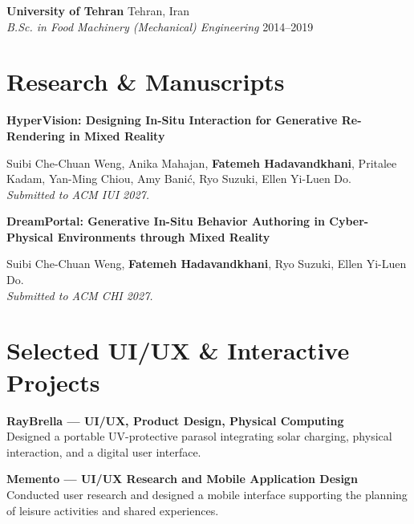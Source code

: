\documentclass[10pt,letterpaper]{article}
\newcommand{\cvitem}[4]{%
  {\bfseries\color{darkteal}#1}
  \hfill
  {\small\color{muted}#2}\\
  {\textit{#3}}
  \hfill
  {\small\color{muted}#4}%
  \vspace{4pt}%
}
\newcommand{\project}[2]{%
  {\bfseries\color{darkteal}#1}\\[1pt]
  {\color{muted}#2}%
  \vspace{7pt}%
}
\begin{document}
\vspace{4pt}

\cvitem
{University of Tehran}
{Tehran, Iran}
{B.Sc. in Food Machinery (Mechanical) Engineering}
{2014--2019}


\section{Research \& Manuscripts}

{\bfseries\color{darkteal}
HyperVision: Designing In-Situ Interaction for Generative
Re-Rendering in Mixed Reality}

\vspace{2pt}

Suibi Che-Chuan Weng, Anika Mahajan,
\textbf{Fatemeh Hadavandkhani},
Pritalee Kadam, Yan-Ming Chiou, Amy Banić,
Ryo Suzuki, Ellen Yi-Luen Do. \\

{\color{muted}\textit{Submitted to ACM IUI 2027.}}

\vspace{10pt}

{\bfseries\color{darkteal}
DreamPortal: Generative In-Situ Behavior Authoring in
Cyber-Physical Environments through Mixed Reality}

\vspace{2pt}

Suibi Che-Chuan Weng,
\textbf{Fatemeh Hadavandkhani},
Ryo Suzuki, Ellen Yi-Luen Do. \\

{\color{muted}\textit{Submitted to ACM CHI 2027.}}


\section{Selected UI/UX \& Interactive Projects}

\project
{RayBrella --- UI/UX, Product Design, Physical Computing}
{Designed a portable UV-protective parasol integrating solar charging,
physical interaction, and a digital user interface.}

\project
{Memento --- UI/UX Research and Mobile Application Design}
{Conducted user research and designed a mobile interface supporting
the planning of leisure activities and shared experiences.}
\end{document}
